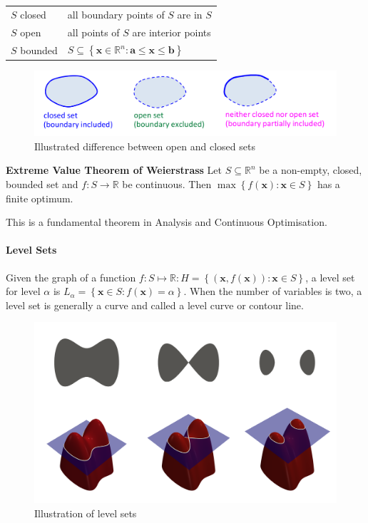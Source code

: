 \documentclass[11pt]{article}
\begin{document}
\begin{tabularx}{\linewidth}{l X}
	$S$ closed & all boundary points of $S$ are in $S$\\
	$S$ open & all points of $S$ are interior points\\
	$S$ bounded & $S\subseteq \left\{ \textbf{x}\in\mathbb{R}^n:\textbf{a}\leq\textbf{x}\leq\textbf{b} \right\}$\\
\end{tabularx}

\begin{figure}[H]
	\centering
	\includegraphics[width=0.8\linewidth, keepaspectratio]{open_closed_sets}
	\caption{Illustrated difference between open and closed sets}
	\label{fig:openclosedsets}
\end{figure}

\begin{theorem}
	\textbf{Extreme Value Theorem of Weierstrass} Let $S \subseteq \mathbb{R}^n$ be a non-empty, closed, bounded set and $f:S \rightarrow \mathbb{R}$ be continuous. Then $\max\left\{ f(\textbf{x}):\textbf{x}\in S \right\}$ has a finite optimum.
\end{theorem}

This is a fundamental theorem in Analysis and Continuous Optimisation.

\paragraph{Level Sets} Given the graph of a function $f:S\mapsto \mathbb{R}: H = \left\{ (\textbf{x},f(\textbf{x})):\textbf{x}\in S \right\}$, a level set for level $\alpha$ is $L_\alpha = \left\{ \textbf{x}\in S:f(\textbf{x}) = \alpha \right\}$. When the number of variables is two, a level set is generally a curve and called a level curve or contour line.

\begin{figure}[H]
	\centering
	\includegraphics[width=0.6\linewidth, keepaspectratio]{level_set_method}
	\caption{Illustration of level sets}
	\label{fig:levelsetmethod}
\end{figure}
\end{document}
